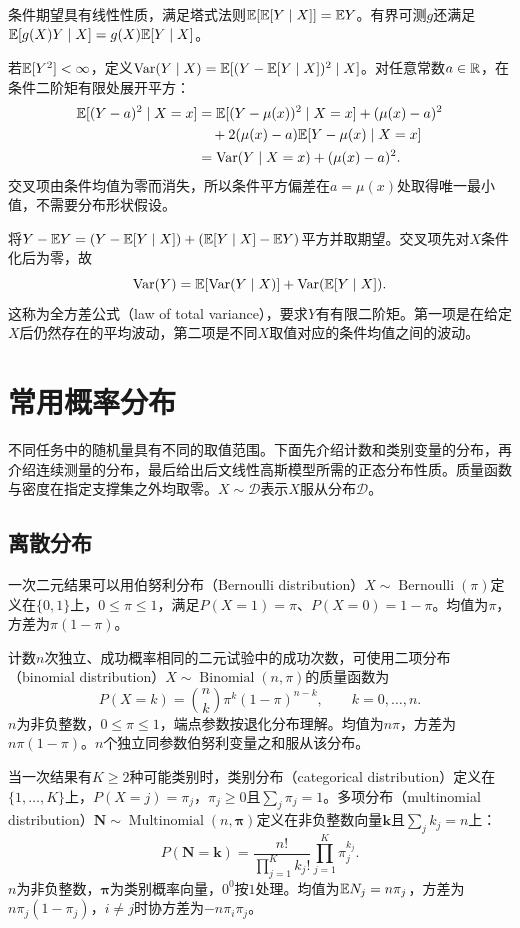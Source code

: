 条件期望具有线性性质，满足塔式法则$\mathbb{E}[\mathbb{E}[Y\mid X]]=\mathbb{E} Y$。有界可测$g$还满足$\mathbb{E}[g(X)Y\mid X]=g(X)\mathbb{E}[Y\mid X]$。

若$\mathbb{E}[Y^2]<\infty$，定义$\operatorname{Var}(Y\mid X)=\mathbb{E}[(Y-\mathbb{E}[Y\mid X])^2\mid X]$。对任意常数$a\in\mathbb{R}$，在条件二阶矩有限处展开平方：
\begin{align}
 \mathbb{E}[(Y-a)^2\mid X=x]
 &=\mathbb{E}[(Y-\mu(x))^2\mid X=x]+(\mu(x)-a)^2\notag\\
 &\quad+2(\mu(x)-a)\mathbb{E}[Y-\mu(x)\mid X=x]\notag\\
 &=\operatorname{Var}(Y\mid X=x)+(\mu(x)-a)^2.
 \label{eq:math-conditional-mse}
\end{align}
交叉项由条件均值为零而消失，所以条件平方偏差在$a=\mu(x)$处取得唯一最小值，不需要分布形状假设。

将$Y-\mathbb{E} Y=(Y-\mathbb{E}[Y\mid X])+(\mathbb{E}[Y\mid X]-\mathbb{E} Y)$平方并取期望。交叉项先对$X$条件化后为零，故
\begin{equation}
 \operatorname{Var}(Y)=\mathbb{E}[\operatorname{Var}(Y\mid X)]+\operatorname{Var}(\mathbb{E}[Y\mid X]).
 \label{eq:math-total-variance}
\end{equation}
这称为全方差公式（law of total variance），要求$Y$有有限二阶矩。第一项是在给定$X$后仍然存在的平均波动，第二项是不同$X$取值对应的条件均值之间的波动。

\section{常用概率分布}
不同任务中的随机量具有不同的取值范围。下面先介绍计数和类别变量的分布，再介绍连续测量的分布，最后给出后文线性高斯模型所需的正态分布性质。质量函数与密度在指定支撑集之外均取零。$X\sim\mathcal D$表示$X$服从分布$\mathcal D$。

\subsection{离散分布}
一次二元结果可以用伯努利分布（Bernoulli distribution）$X\sim\operatorname{Bernoulli}(\pi)$定义在$\{0,1\}$上，$0\leq\pi\leq1$，满足$P(X=1)=\pi$、$P(X=0)=1-\pi$。均值为$\pi$，方差为$\pi(1-\pi)$。

计数$n$次独立、成功概率相同的二元试验中的成功次数，可使用二项分布（binomial distribution）$X\sim\operatorname{Binomial}(n,\pi)$的质量函数为
\begin{equation}
 P(X=k)=\binom nk\pi^k(1-\pi)^{n-k},\qquad k=0,\ldots,n.
\end{equation}
$n$为非负整数，$0\leq\pi\leq1$，端点参数按退化分布理解。均值为$n\pi$，方差为$n\pi(1-\pi)$。$n$个独立同参数伯努利变量之和服从该分布。

当一次结果有$K\geq2$种可能类别时，类别分布（categorical distribution）定义在$\{1,\ldots,K\}$上，$P(X=j)=\pi_j$，$\pi_j\geq0$且$\sum_j\pi_j=1$。多项分布（multinomial distribution）$\bm N\sim\operatorname{Multinomial}(n,\bm\pi)$定义在非负整数向量$\bm k$且$\sum_jk_j=n$上：
\begin{equation}
 P(\bm N=\bm k)=\frac{n!}{\prod_{j=1}^Kk_j!}\prod_{j=1}^K\pi_j^{k_j}.
\end{equation}
$n$为非负整数，$\bm\pi$为类别概率向量，$0^0$按$1$处理。均值为$\mathbb{E} N_j=n\pi_j$，方差为$n\pi_j(1-\pi_j)$，$i\ne j$时协方差为$-n\pi_i\pi_j$。

